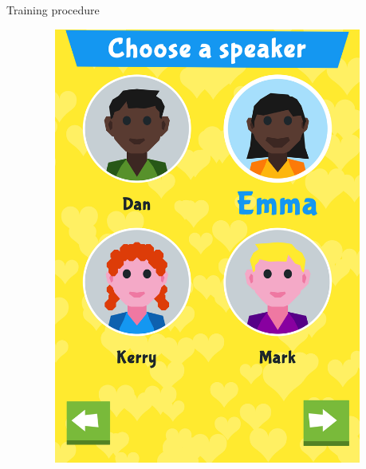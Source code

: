 \documentclass[final,xcolor={cmyk,hyperref}]{beamer}
\begin{document}
\begin{frame}[t]
\begin{columns}[t]
\begin{column}{0.4\linewidth}
\begin{block}{Training procedure}
\begin{figure}[h]
\begin{columns}
\begin{column}{\screenshotwidth}
  \end{column}
  \begin{column}{\screenshotwidth}
    \includegraphics[width=\linewidth]{images/CALVin-screenshots/jpgs/choose_talker}
  \end{column}
  \begin{column}{\screenshotwidth}

\end{column}
\end{columns}
\end{figure}
\end{block}
\end{column}
\end{columns}
\end{frame}
\end{document}

